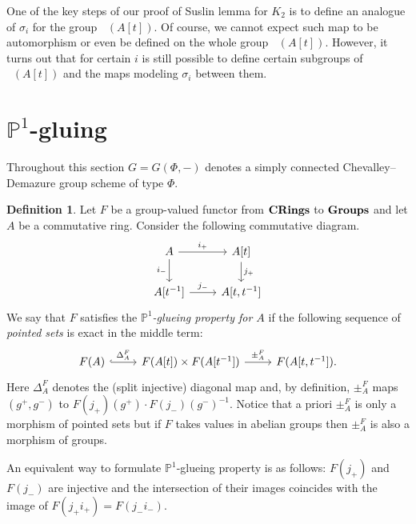 \documentclass[oneside,12pt]{amsart}
\numberwithin{equation}{section}
\numberwithin{lem}{section}
\theoremstyle{definition}
\newtheorem{dfn}[lem]{Definition}
\theoremstyle{remark}
\DeclareMathOperator{\St}{St^G}
\newcommand{\catname}[1]{{\normalfont\textbf{#1}}}
\newcommand{\Pro}{\mathbb{P}}
\begin{document}
One of the key steps of our proof of Suslin lemma for $K_2$ is to define an analogue of $\sigma_i$ for the group $\St(A[t])$.
Of course, we cannot expect such map to be automorphism or even be defined on the whole group $\St(A[t])$.
However, it turns out that for certain $i$ is still possible to define certain subgroups of $\St(A[t])$ and the maps modeling $\sigma_i$ between them.

\section{\texorpdfstring{$\Pro^1$}{P\textonesuperior}-gluing}
Throughout this section $G=G(\Phi, -)$ denotes a simply connected Chevalley--Demazure group scheme of type $\Phi$.

\begin{dfn} \label{def:p1g} Let $F$ be a group-valued functor from $\catname{CRings}$ to $\catname{Groups}$ and let $A$ be a commutative ring.
Consider the following commutative diagram.
\[ \begin{tikzcd} A \ar[r, "i_+"] \ar[d, "i_-"'] & A[t] \ar[d, "j_+"] \\ A[t^{-1}] \ar[r, "j_-"] & A[t, t^{-1}] \end{tikzcd} \]
We say that $F$ satisfies the \emph{$\Pro^1$-glueing property for $A$} if the following sequence of \emph{pointed sets} is exact in the middle term:
\[ \begin{tikzcd} F(A) \ar[r, hookrightarrow, "\Delta_A^F"] & F(A[t]) \times F(A[t^{-1}]) \ar[r, "\pm_A^F"] & F(A[t, t^{-1}]). \end{tikzcd} \]
Here $\Delta^F_A$ denotes the (split injective) diagonal map and, by definition, $\pm_A^F$ maps $(g^+, g^-)$ to $F(j_+)(g^+) \cdot F(j_-)(g^-)^{-1}.$
Notice that a priori $\pm_A^F$ is only a morphism of pointed sets but if $F$ takes values in abelian groups then $\pm_A^F$ is also a morphism of groups.

An equivalent way to formulate $\Pro^1$-glueing property is as follows:
$F(j_+)$ and $F(j_-)$ are injective and the intersection of their images coincides with the image of $F(j_+ i_+) = F(j_- i_-).$ \end{dfn}
\end{document}
